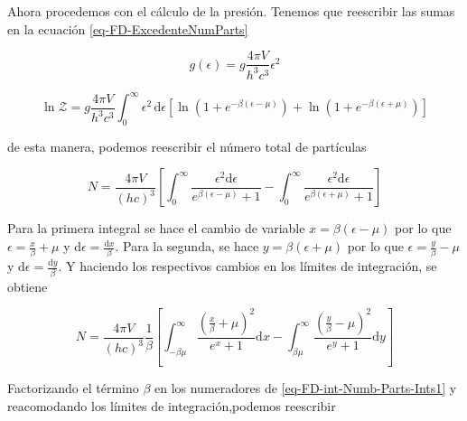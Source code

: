 

Ahora procedemos con el cálculo de la presión. Tenemos que reescribir las sumas en la ecuación \eqref{eq-FD-ExcedenteNumParts}

\begin{equation}
{g}(\epsilon) = g \frac{4\pi V}{{h}^{3}{c}^{3}} {\epsilon}^{2}
\end{equation}

\begin{equation}
\ln \mathcal{Z} = g \frac{4 \pi V}{{h}^{3}{c}^{3}} \int_{0}^{\infty} {\epsilon}^{2} \, \mathrm{d} \epsilon \left[\ln \left( 1 + {e}^{-\beta \left(\epsilon - \mu \right)} \right) + \ln \left(1 + {e}^{-\beta \left(\epsilon + \mu\right)} \right) \right]
\end{equation}

de esta manera, podemos reescribir el número total de partículas 

\begin{equation}
N =\frac{4 \pi V}{(hc)^{3}} \left[ \int_{0}^{\infty} \frac{{\epsilon}^{2} \mathrm{d} \epsilon}{{e}^{\beta (\epsilon-\mu)} + 1} - \int_{0}^{\infty} \frac{{\epsilon}^{2} \mathrm{d} \epsilon}{{e}^{\beta (\epsilon+\mu)} + 1} \right] 
\end{equation}

Para la primera integral se hace el cambio de variable $x = \beta (\epsilon - \mu)$ por lo que  $\epsilon = \frac{x}{\beta} + \mu$ y $\mathrm{d} \epsilon = \frac{\mathrm{d}x }{\beta} $. Para la segunda, se hace $y = \beta(\epsilon + \mu)$ por lo que  $\epsilon = \frac{y}{\beta} - \mu$ y $\mathrm{d}\epsilon = \frac{\mathrm{d}y}{\beta}$. Y haciendo los respectivos cambios en los límites de integración, se obtiene 

\begin{equation}\label{eq-FD-int-Numb-Parts-Ints1}
N = \frac{4 \pi V}{(hc)^{3}} \frac{1}{\beta} \left[ \int_{-\beta \mu}^{\infty} \frac{(\frac{x}{\beta} + \mu)^{2}}{{e}^{x}+1}  \mathrm{d}x - \int_{\beta \mu}^{\infty} \frac{(\frac{y}{\beta} - \mu)^{2}}{{e}^{y}+1}  \mathrm{d}y \right]
\end{equation}

Factorizando el término $\beta$ en los numeradores de \eqref{eq-FD-int-Numb-Parts-Ints1} y reacomodando los límites de integración,podemos reescribir

